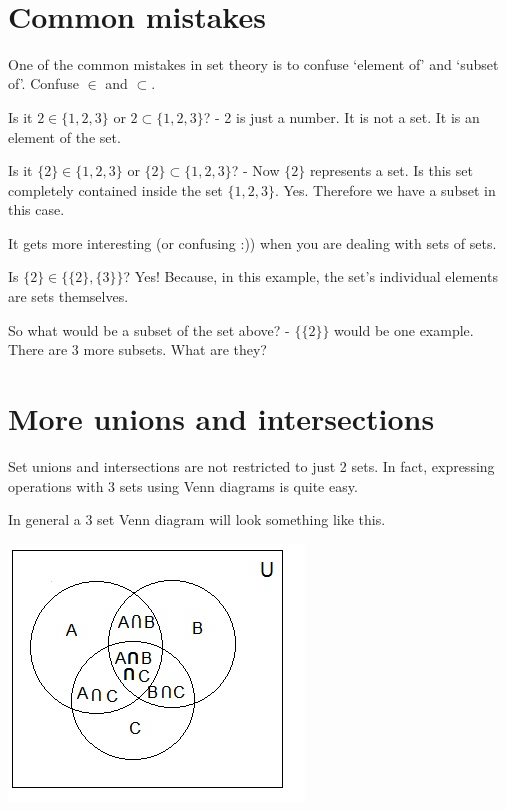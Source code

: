 \documentclass[12pt]{article}
\begin{document}
\begin{center}
\\
\vspace{1cm}
\end{center}


\medskip\noindent
	

\vspace{0.5cm}\noindent

\section*{Common mistakes}

One of the common mistakes in set theory is to confuse `element of' and `subset of'. Confuse $\in$ and $\subset$.

Is it $2 \in \{1,2,3\}$ or $2 \subset \{1,2,3\}$? - 2 is just a number. It is not a set. It is an element of the set.

Is it $\{2\} \in \{1,2,3\}$ or $\{2\} \subset \{1,2,3\}$? - Now $\{2\}$ represents a set. Is this set completely contained inside the set $\{1,2,3\}$. Yes. Therefore we have a subset in this case.

It gets more interesting (or confusing :)) when you are dealing with sets of sets.

Is $\{2\} \in \{\{2\},\{3\}\}$? Yes! Because, in this example, the set's individual elements are sets themselves.

So what would be a subset of the set above? - $\{\{2\}\}$ would be one example. There are 3 more subsets. What are they?

\section*{More unions and intersections}

Set unions and intersections are not restricted to just 2 sets. In fact, expressing operations with 3 sets using Venn diagrams is quite easy.

In general a 3 set Venn diagram will look something like this.

\includegraphics{3setsVenn.png}
\end{document}
